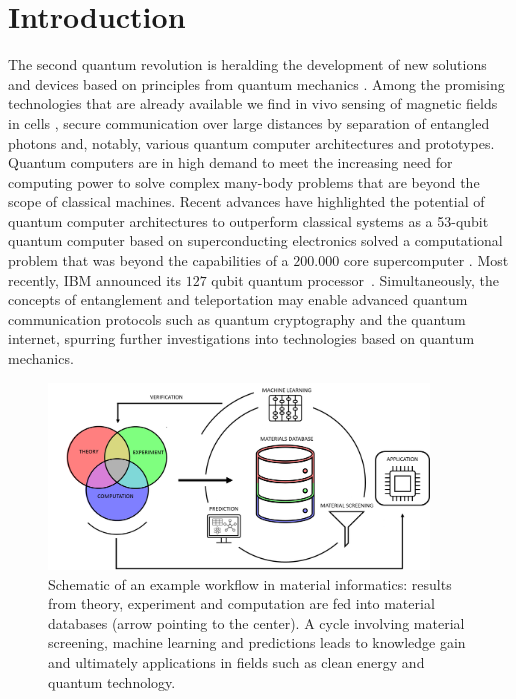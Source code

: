 \documentclass[superscriptaddress,unsortedaddress,
 amsmath,amssymb,
 aps,
]{revtex4-2}
\begin{document}
\section*{Introduction}
The second quantum revolution is heralding the development of new solutions and devices based on principles from quantum mechanics \cite{Acin2018}. Among the promising technologies that are already available we find in vivo sensing of magnetic fields in cells \cite{Lesage_2013}, secure communication over large distances by separation of entangled photons \cite{Ursin2007} and, notably, various quantum computer architectures and prototypes. 
Quantum computers are in high demand to meet the increasing need for computing power to solve complex many-body problems that are beyond the scope of classical machines.   
Recent advances have highlighted the potential of quantum computer architectures to outperform classical systems as a 53-qubit quantum computer based on superconducting electronics solved a computational problem that was beyond the capabilities of a $200.000$ core supercomputer \cite{Arute_2019}. Most recently, IBM announced its $127$ qubit quantum processor~\cite{IBM2021}. Simultaneously, the concepts of entanglement and teleportation may enable advanced quantum communication protocols such as quantum cryptography and the quantum internet, spurring further investigations into technologies based on quantum mechanics.

\begin{figure}[t]
    \centering
    \includegraphics[width=0.9\textwidth]{figures/ht-workflow-new-2.png}
    \caption{Schematic of an example workflow in material informatics: results from theory, experiment and computation are fed into material databases (arrow pointing to the center). A cycle involving material screening, machine learning and predictions leads to knowledge gain and ultimately applications in fields such as clean energy and quantum technology. 
    }
    \label{fig:ht-workflow}
\end{figure}
\end{document}
